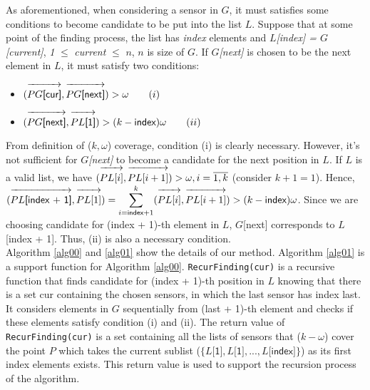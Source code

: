 As aforementioned, when considering a sensor in $G$, it must satisfies some conditions to become candidate to be put into the list $L$. Suppose that at some point of the finding process, the list has {\sf\itshape index} elements and {\sf\itshape $L$[index] = $G$[current]}, {\sf\itshape 1} $\leq$ {\sf\itshape current} $\leq$ {\sf\itshape $n$}, $n$ is size of $G$. If {\sf\itshape $G$[next]} is chosen to be the next element in $L$, it must satisfy two conditions:
\begin{itemize}
	\item $(\overrightarrow{\vphantom{\overrightarrow{P}}PG\textsf{[cur]}}, \overrightarrow{\vphantom{\overrightarrow{P}}PG\textsf{[next]}}) > \omega \qquad (i)$
	\item $(\overrightarrow{\vphantom{\overrightarrow{P}}PG\textsf{[next]}}, \overrightarrow{\vphantom{\overrightarrow{P}}PL\textsf{[1]}}) > (k-\textsf{index})\omega \qquad (ii)$
\end{itemize}
From definition of ($k,\omega$) coverage, condition (i) is clearly necessary. However, it's not sufficient for {\sf\itshape $G$[next]} to become a candidate for the next position in $L$. If $L$ is a valid list, we have $(\overrightarrow{\vphantom{\overrightarrow{P}}PL[i]}, \overrightarrow{\vphantom{\overrightarrow{P}}PL[i+1]}) > \omega, i = \overline{1,k}$ (consider $k + 1 = 1$). Hence, $(\overrightarrow{\vphantom{\overrightarrow{P}}PL\textsf{[index + 1]}}, \overrightarrow{\vphantom{\overrightarrow{P}}PL[1]}) = \displaystyle\sum\limits_{i=\textsf{\scriptsize index} + 1}^{k}(\overrightarrow{\vphantom{\overrightarrow{P}}PL[i]}, \overrightarrow{\vphantom{\overrightarrow{P}}PL[i+1]}) > (k-\textsf{index})\omega$.
Since we are choosing candidate for {\sf (index + 1)-th} element in $L$, {\sf $G$[next]} corresponds to {\sf $L$[index + 1]}. Thus, (ii) is also a necessary condition.\\[7pt]
Algorithm \ref{alg00} and \ref{alg01} show the details of our method. Algorithm \ref{alg01} is a support function for Algorithm \ref{alg00}. {\tt RecurFinding(cur)} is a recursive function that finds candidate for {\sf (index + 1)-th} position in $L$ knowing that there is a set {\sf cur} containing the chosen sensors, in which the last sensor has index {\sf last}. It considers elements in $G$ sequentially from {\sf (last + 1)-th} element and checks if these elements satisfy condition (i) and (ii). The return value of {\tt RecurFinding(cur)} is a set containing all the lists of sensors that ($k-\omega$) cover the point $P$ which takes the current sublist ($\{L\textsf{[1]}, L\textsf{[1]},..., L\textsf{[index]}\}$) as its first {\sf index} elements exists. This return value is used to support the recursion process of the algorithm.

